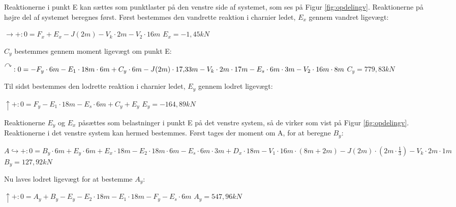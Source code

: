 Reaktionerne i punkt E kan sættes som punktlaster på den venstre side af systemet, som ses på Figur \ref{fig:opdelingv}. Reaktionerne på højre del af systemet beregnes først.
\newline
\newline
Først bestemmes den vandrette reaktion i charnier ledet, $E_x$ gennem vandret ligevægt: 
\begin{center}
	$\rightarrow+:0 = F_x + E_x - J(2m) - V_k \cdot 2m - V_2 \cdot 16m$
	\newline
	$E_x = -1,\!45 kN$
\end{center}

$C_y$ bestemmes gennem moment ligevægt om punkt E: 
\begin{center}
	$\AR{}:0 = -F_y \cdot 6m - E_1 \cdot 18m \cdot 6m + C_y \cdot 6m - J(2m) \cdot 17,\!33m - V_k \cdot 2m \cdot 17m - E_s \cdot 6m \cdot 3m - V_2 \cdot 16m \cdot 8m$
	\newline
	$C_y = 779,\!83 kN$
\end{center}

Til sidst bestemmes den lodrette reaktion i charnier ledet, $E_y$ gennem lodret ligevægt: 
\begin{center}
	$\uparrow+: 0 = F_y - E_1 \cdot 18m - E_s \cdot 6m + C_y + E_y$
	\newline	
	$E_y = -164,\!89 kN$
\end{center}

Reaktionerne $E_y$ og $E_x$ påsættes som belastninger i punkt E på det venstre system, så de virker som vist på Figur \ref{fig:opdelingv}. Reaktionerne i det venstre system kan hermed bestemmes.
\newline
\newline
Først tages der moment om A, for at beregne $B_y$:
\begin{center}
	$A\hookrightarrow+: 0 = B_y \cdot 6m + E_y \cdot 6m + E_x \cdot 18m - E_2 \cdot 18m \cdot 6m - E_s \cdot 6m \cdot 3m + D_x \cdot 18m - V_1 \cdot 16m \cdot (8m + 2m) - J(2m) \cdot (2m \cdot \frac{1}{3}) - V_k \cdot 2m \cdot 1m$
	\newline 
	$B_y = 127,\!92 kN$
\end{center}

Nu laves lodret ligevægt for at bestemme $A_y$:
\begin{center}
	$\uparrow+: 0 = A_y + B_y - E_y - E_2 \cdot 18m - E_1 \cdot 18m - F_y - E_s \cdot 6 m$
	\newline
	$A_y = 547,\!96 kN$
\end{center}


